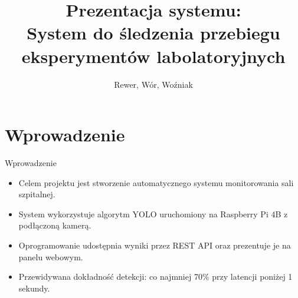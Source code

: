 \documentclass[polish,aspectratio=1610]{beamer}
\title{Prezentacja systemu:\\System do śledzenia przebiegu eksperymentów labolatoryjnych}
\author{Rewer, Wór, Woźniak}
\date{}
\begin{document}
\maketitle

\section{Wprowadzenie}
\begin{frame}{Wprowadzenie}
    \begin{itemize}
        \item Celem projektu jest stworzenie automatycznego systemu monitorowania sali szpitalnej.
        \item System wykorzystuje algorytm YOLO uruchomiony na Raspberry Pi 4B z podłączoną kamerą.
        \item Oprogramowanie udostępnia wyniki przez REST API oraz prezentuje je na panelu webowym.
        \item Przewidywana dokładność detekcji: co najmniej 70\% przy latencji poniżej 1 sekundy.
    \end{itemize}
\end{frame}
\end{document}
